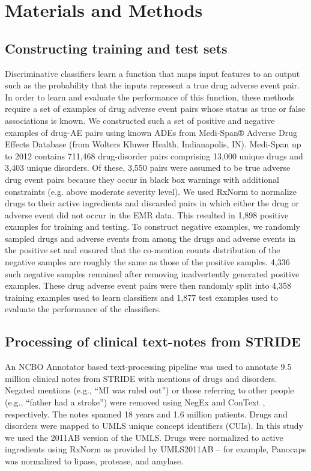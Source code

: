 \section{Materials and Methods}
\subsection{Constructing training and test sets}
Discriminative classifiers learn a function that maps input features
to an output such as the probability that the inputs represent a true
drug adverse event pair. In order to learn and evaluate the
performance of this function, these methods require a set of examples
of drug adverse event pairs whose status as true or false associations
is known. We constructed such a set of positive and negative examples
of drug-AE pairs using known ADEs from Medi-Span® Adverse Drug Effects
Database (from Wolters Kluwer Health, Indianapolis, IN). Medi-Span up
to 2012 contains 711,468 drug-disorder pairs comprising 13,000 unique
drugs and 3,403 unique disorders. Of these, 3,550 pairs were assumed
to be true adverse drug event pairs because they occur in black box
warnings with additional constraints (e.g. above moderate severity
level). We used RxNorm to normalize drugs to their active ingredients
and discarded pairs in which either the drug or adverse event did not
occur in the EMR data. This resulted in 1,898 positive examples for
training and testing. To construct negative examples, we randomly
sampled drugs and adverse events from among the drugs and adverse
events in the positive set and ensured that the co-mention counts
distribution of the negative samples are roughly the same as those of
the positive samples. 4,336 such negative samples remained after
removing inadvertently generated positive examples. These drug adverse
event pairs were then randomly split into 4,358 training examples used
to learn classifiers and 1,877 test examples used to evaluate the
performance of the classifiers.

\subsection{Processing of clinical text-notes from STRIDE}
An NCBO Annotator based text-processing pipeline
\cite{Lependu2012,Jung2014b} was used to annotate 9.5 million clinical
notes from STRIDE with mentions of drugs and disorders. Negated
mentions (e.g., “MI was ruled out”) or those referring to other people
(e.g., “father had a stroke”) were removed using NegEx
\cite{Chapman2001} and ConText \cite{Chapman2007}, respectively.  The
notes spanned 18 years and 1.6 million patients. Drugs and disorders
were mapped to UMLS unique concept identifiers (CUIs). In this study
we used the 2011AB version of the UMLS. Drugs were normalized to
active ingredients using RxNorm \cite{Nelson2011} as provided by
UMLS2011AB – for example, Panocaps was normalized to lipase, protease,
and amylase.

